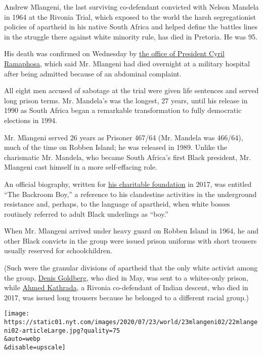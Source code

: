 Andrew Mlangeni, the last surviving co-defendant convicted with Nelson
Mandela in 1964 at the Rivonia Trial, which exposed to the world the
harsh segregationist policies of apartheid in his native South Africa
and helped define the battles lines in the struggle there against white
minority rule, has died in Pretoria. He was 95.

His death was confirmed on Wednesday by
\href{http://www.thepresidency.gov.za/press-statements/president-saddened-passing-struggle-hero-andrew-mekete-mlangeni}{the
office of President Cyril Ramaphosa}, which said Mr. Mlangeni had died
overnight at a military hospital after being admitted because of an
abdominal complaint.

All eight men accused of sabotage at the trial were given life sentences
and served long prison terms. Mr. Mandela's was the longest, 27 years,
until his release in 1990 as South Africa began a remarkable
transformation to fully democratic elections in 1994.

Mr. Mlangeni served 26 years as Prisoner 467/64 (Mr. Mandela was
466/64), much of the time on Robben Island; he was released in 1989.
Unlike the charismatic Mr. Mandela, who became South Africa's first
Black president, Mr. Mlangeni cast himself in a more self-effacing role.

An official biography, written for
\href{https://mlangenifoundation.org}{his charitable foundation} in
2017, was entitled ``The Backroom Boy,'' a reference to his clandestine
activities in the underground resistance and, perhaps, to the language
of apartheid, when white bosses routinely referred to adult Black
underlings as ``boy.''

When Mr. Mlangeni arrived under heavy guard on Robben Island in 1964, he
and other Black convicts in the group were issued prison uniforms with
short trousers usually reserved for schoolchildren.

(Such were the granular divisions of apartheid that the only white
activist among the group,
\href{https://www.nytimes.com/2020/05/08/world/africa/denis-goldberg-dead.html}{Denis
Goldberg}, who died in May, was sent to a whites-only prison, while
\href{https://www.nytimes.com/2017/03/28/world/africa/ahmed-kathrada-dies-nelson-mandela.html}{Ahmed
Kathrada}, a Rivonia co-defendant of Indian descent, who died in 2017,
was issued long trousers because he belonged to a different racial
group.)

\texttt{[image: https://static01.nyt.com/images/2020/07/23/world/23mlangeni02/22mlangeni02-articleLarge.jpg?quality=75\\\&auto=webp\\\&disable=upscale]}

